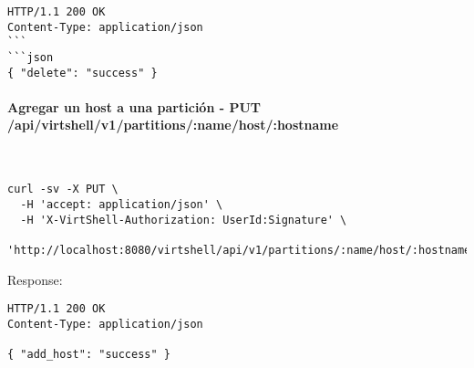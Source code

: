 \begin{lstlisting}[style=json]
HTTP/1.1 200 OK
Content-Type: application/json
```
```json
{ "delete": "success" }
\end{lstlisting}

\paragraph{Agregar un host a una partición - PUT \\ /api/virtshell/v1/partitions/:name/host/:hostname} ~\\

\begin{lstlisting}[style=json]
curl -sv -X PUT \
  -H 'accept: application/json' \
  -H 'X-VirtShell-Authorization: UserId:Signature' \
  'http://localhost:8080/virtshell/api/v1/partitions/:name/host/:hostname'
\end{lstlisting}

Response:

\begin{lstlisting}[style=json]
HTTP/1.1 200 OK
Content-Type: application/json

{ "add_host": "success" }
\end{lstlisting}